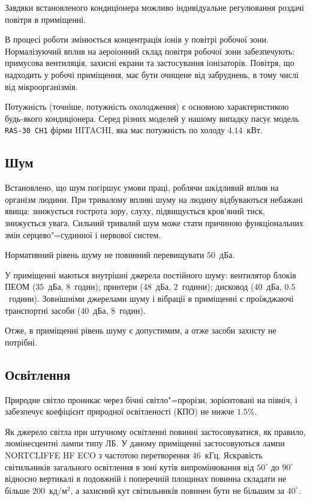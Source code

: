 \documentclass{diploma}
\begin{document}
      Завдяки встановленого кондиціонера можливо індивідуальне регулювання
      роздачі повітря в приміщенні.

      В процесі роботи змінюється концентрація іонів у повітрі робочої зони.
      Нормалізуючий вплив на аероіонний склад повітря робочої зони
      забезпечують: примусова вентиляція, захисні екрани та застосування
      іонізаторів.
      Повітря, що надходить у робочі приміщення, має бути очищене від
      забруднень, в тому числі від мікроорганізмів.

      Потужність (точніше, потужність охолодження) є основною характеристикою
      будь-якого кондиціонера.
      Серед різних моделей у нашому випадку пасує модель \texttt{RAS-30 CH1}
      фірми HITACHI, яка має потужність по холоду $4.14$~кВт.
      \clearpage
    \subsection{Шум}
      Встановлено, що шум погіршує умови праці, роблячи шкідливий вплив на
      організм людини.
      При тривалому впливі шуму на людину відбуваються небажані явища:
      знижується гострота зору, слуху, підвищується кров’яний тиск, знижується
      увага.
      Сильний тривалий шум може стати причиною функціональних змін
      серцево"=судинної і нервової систем.

      Нормативний рівень шуму не повинний перевищувати $50$~дБа\cite{dsn037}.

      У приміщенні маються внутрішні джерела постійного шуму: вентилятор
      блоків ПЕОМ ($35$~дБа, $8$~годин); принтери ($48$~дБа, $2$~години);
      дисковод ($40$~дБа, $0.5$~години).
      Зовнішніми джерелами шуму і вібрації в приміщенні є проїжджаючі
      транспортні засоби ($40$~дБа, $8$~годин).

      Отже, в приміщенні рівень шуму є допустимим, а отже засоби захисту не
      потрібні.
    \subsection{Освітлення}
      Природне світло проникає через бічні світло"=прорізи, зорієнтовані на
      північ, і забезпечує коефіцієнт природної освітленості (КПО) не нижче
      $1.5\%$.

      Як джерело світла при штучному освітленні повинні застосовуватися, як
      правило, люмінесцентні лампи типу ЛБ.
      У даному приміщенні застосовуються лампи NORTCLIFFE HF ECO з частотою
      перетворення $46$~кГц.
      Яскравість світильників загального освітлення в зоні кутів
      випромінювання від $50^\circ$ до $90^\circ$ відносно вертикалі в
      подовжній і поперечній площинах повинна складати не більше
      $200$~кд/м$^2$, а захисний кут світильників повинен бути не більшим за
      $40^\circ$.~\cite{dbn28}
\end{document}
